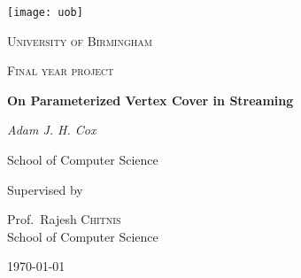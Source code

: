 \begin{titlepage}

    \thispagestyle{empty}
    \setlength\headheight{0pt}
    \begin{center}

        \center\texttt{[image: uob]}

        \vspace{0.25cm}
        {\scshape\LARGE University of Birmingham \par}
        \vspace{0.25cm}
        {\scshape\Large Final year project\par}
        \vspace{0.5cm}

        {\Large\bfseries On Parameterized Vertex Cover in Streaming\par}

        \vspace{0.5cm}
        {\Large\itshape Adam J. H. Cox\par}
        School of Computer Science
        \vspace{0.25cm}

        \vspace{1cm}
        Supervised by\par
        Prof.~Rajesh \textsc{Chitnis} \\
        School of Computer Science\par
        \vspace{1.5cm}
        \large
        \today

    \end{center}

    \clearpage
    \restoregeometry
\end{titlepage}
